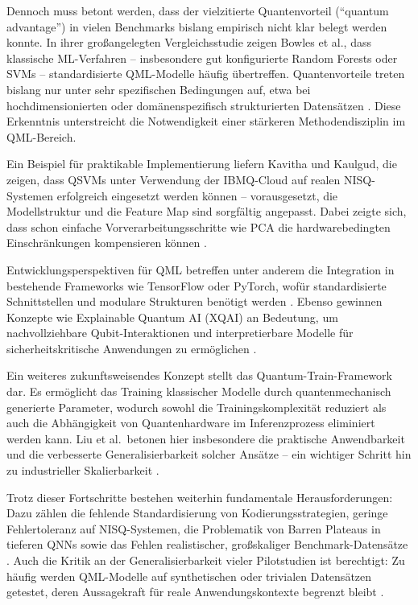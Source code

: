 Dennoch muss betont werden, dass der vielzitierte Quantenvorteil (``quantum advantage'') in vielen Benchmarks bislang empirisch nicht klar belegt werden konnte. In ihrer großangelegten Vergleichsstudie zeigen Bowles et al., dass klassische ML-Verfahren – insbesondere gut konfigurierte Random Forests oder SVMs – standardisierte QML-Modelle häufig übertreffen. Quantenvorteile treten bislang nur unter sehr spezifischen Bedingungen auf, etwa bei hochdimensionierten oder domänenspezifisch strukturierten Datensätzen \cite{bowlesBetterClassicalSubtle2024}. Diese Erkenntnis unterstreicht die Notwendigkeit einer stärkeren Methodendisziplin im QML-Bereich.

Ein Beispiel für praktikable Implementierung liefern Kavitha und Kaulgud, die zeigen, dass QSVMs unter Verwendung der IBMQ-Cloud auf realen NISQ-Systemen erfolgreich eingesetzt werden können – vorausgesetzt, die Modellstruktur und die Feature Map sind sorgfältig angepasst. Dabei zeigte sich, dass schon einfache Vorverarbeitungsschritte wie PCA die hardwarebedingten Einschränkungen kompensieren können \cite{kavithaQuantumMachineLearning2024}.

Entwicklungsperspektiven für QML betreffen unter anderem die Integration in bestehende Frameworks wie TensorFlow oder PyTorch, wofür standardisierte Schnittstellen und modulare Strukturen benötigt werden \cite{gujjuQuantumMachineLearning2024}. Ebenso gewinnen Konzepte wie Explainable Quantum AI (XQAI) an Bedeutung, um nachvollziehbare Qubit-Interaktionen und interpretierbare Modelle für sicherheitskritische Anwendungen zu ermöglichen \cite{jerbiShadowsQuantumMachine2024}.

Ein weiteres zukunftsweisendes Konzept stellt das Quantum-Train-Framework dar. Es ermöglicht das Training klassischer Modelle durch quantenmechanisch generierte Parameter, wodurch sowohl die Trainingskomplexität reduziert als auch die Abhängigkeit von Quantenhardware im Inferenzprozess eliminiert werden kann. Liu et al.\ betonen hier insbesondere die praktische Anwendbarkeit und die verbesserte Generalisierbarkeit solcher Ansätze – ein wichtiger Schritt hin zu industrieller Skalierbarkeit \cite{liuQuantumTrainRethinkingHybrid2024}.

Trotz dieser Fortschritte bestehen weiterhin fundamentale Herausforderungen: Dazu zählen die fehlende Standardisierung von Kodierungsstrategien, geringe Fehlertoleranz auf NISQ-Systemen, die Problematik von Barren Plateaus in tieferen QNNs sowie das Fehlen realistischer, großskaliger Benchmark-Datensätze . Auch die Kritik an der Generalisierbarkeit vieler Pilotstudien ist berechtigt: Zu häufig werden QML-Modelle auf synthetischen oder trivialen Datensätzen getestet, deren Aussagekraft für reale Anwendungskontexte begrenzt bleibt \cite{bowlesBetterClassicalSubtle2024, peral-garciaSystematicLiteratureReview2024}.

